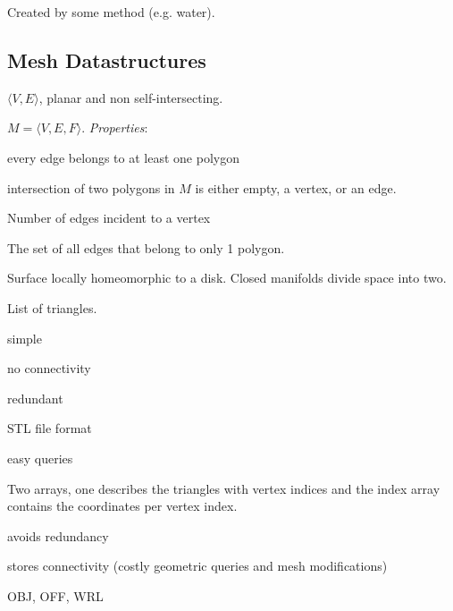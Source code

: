 \begin{definition}
  Created by some method (e.g. water).
\end{definition}

\subsection{Mesh Datastructures}

\begin{definition}[Polygon]
  \(\langle V, E\rangle\), planar and non self-intersecting.
\end{definition}

\begin{definition}
  \(M = \langle V, E, F\rangle\).
  \textit{Properties}:
  \begin{itemize*}
    \item every edge belongs to at least one polygon
    \item intersection of two polygons in \(M\) is either empty, a vertex, or an edge.
  \end{itemize*}
\end{definition}

\begin{definition}[Valence]
  Number of edges incident to a vertex
\end{definition}

\begin{definition}[Boundary]
  The set of all edges that belong to only 1 polygon.
\end{definition}

\begin{definition}[Manifold]
  Surface locally homeomorphic to a disk. Closed manifolds divide space into two.
\end{definition}

\begin{definition}
  List of triangles.
  \begin{itemize*}
    \item simple
    \item no connectivity
    \item redundant
    \item STL file format
    \item easy queries
  \end{itemize*}
\end{definition}

\begin{definition}
  Two arrays, one describes the triangles with vertex indices and the index array contains the coordinates per vertex index.
  \begin{itemize*}
    \item avoids redundancy
    \item stores connectivity (costly geometric queries and mesh modifications)
    \item OBJ, OFF, WRL
  \end{itemize*}
\end{definition}

